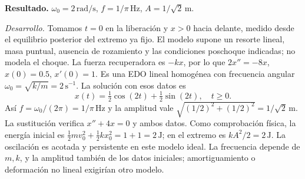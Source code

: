 \noindent\textbf{Resultado.} \(\omega_0=2\,\mathrm{rad/s}\), \(f=1/\pi\,\mathrm{Hz}\), \(A=1/\sqrt2\,\mathrm m\).

\noindent\textit{Desarrollo.} Tomamos \(t=0\) en la liberación y \(x>0\) hacia delante, medido desde el equilibrio posterior del extremo ya fijo. El modelo supone un resorte lineal, masa puntual, ausencia de rozamiento y las condiciones poschoque indicadas; no modela el choque.
La fuerza recuperadora es \(-kx\), por lo que \(2x''=-8x\), \(x(0)=0.5\), \(x'(0)=1\).
Es una EDO lineal homogénea con frecuencia angular \(\omega_0=\sqrt{k/m}=2\,\mathrm{s^{-1}}\). La solución con esos datos es
\[x(t)=\tfrac12\cos(2t)+\tfrac12\sin(2t),\quad t\ge0.\]
Así \(f=\omega_0/(2\pi)=1/\pi\,\mathrm{Hz}\) y la amplitud vale \(\sqrt{(1/2)^2+(1/2)^2}=1/\sqrt2\,\mathrm m\).
La sustitución verifica \(x''+4x=0\) y ambos datos. Como comprobación física, la energía inicial es
\(\tfrac12mv_0^2+\tfrac12kx_0^2=1+1=2\,\mathrm J\); en el extremo es \(kA^2/2=2\,\mathrm J\).
La oscilación es acotada y persistente en este modelo ideal. La frecuencia depende de \(m,k\), y la amplitud también de los datos iniciales; amortiguamiento o deformación no lineal exigirían otro modelo.
